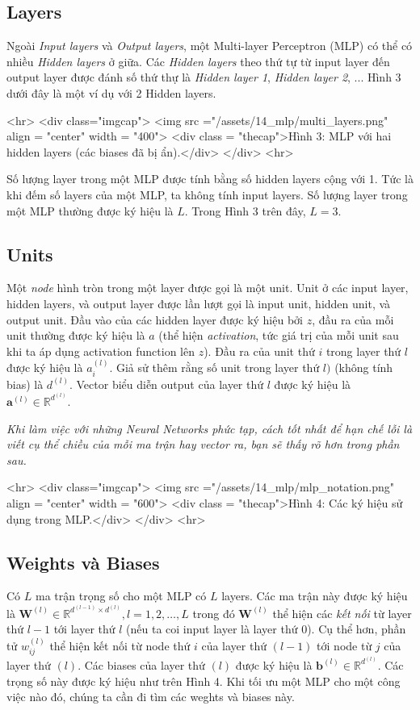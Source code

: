 { 
\subsection{Layers}
Ngoài \textit{Input layers} và \textit{Output layers}, một Multi-layer Perceptron (MLP) có thể có nhiều \textit{Hidden layers} ở giữa. Các \textit{Hidden layers} theo thứ tự từ input layer đến output layer được đánh số thứ thự là \textit{Hidden layer 1}, \textit{Hidden layer 2}, ... Hình 3 dưới đây là một ví dụ với 2 Hidden layers. 
 
<hr> 
<div class="imgcap"> 
 <img src ="/assets/14_mlp/multi_layers.png" align = "center" width = "400"> 
 <div class = "thecap">Hình 3: MLP với hai hidden layers (các biases đã bị ẩn).</div> 
</div> 
<hr> 
 
 
Số lượng layer trong một MLP được tính bằng số hidden layers cộng với 1. Tức là khi đếm số layers của một MLP, ta không tính input layers. Số lượng layer trong một MLP thường được ký hiệu là $L$. Trong Hình 3 trên đây, $L = 3$. 
 
 
\subsection{Units}
Một \textit{node} hình tròn trong một layer được gọi là một unit. Unit ở các input layer, hidden layers, và output layer được lần lượt gọi là input unit, hidden unit, và output unit. Đầu vào của các hidden layer được ký hiệu bởi $z$, đầu ra của mỗi unit thường được ký hiệu là $a$ (thể hiện \textit{activation}, tức giá trị của mỗi unit sau khi ta áp dụng activation function lên $z$). Đầu ra của unit thứ $i$ trong layer thứ $l$ được ký hiệu là $a_i^{(l)}$. Giả sử thêm rằng số unit trong layer thứ $l)$ (không tính bias) là $d^{(l)}$. Vector biểu diễn output của layer thứ $l$ được ký hiệu là $\mathbf{a}^{(l)} \in \mathbb{R}^{d^{(l)}}$. 
 
\textit{Khi làm việc với những Neural Networks phức tạp, cách tốt nhất để hạn chế lỗi là viết cụ thể chiều của mỗi ma trận hay vector ra, bạn sẽ thấy rõ hơn trong phần sau.} 
 
 
<hr> 
<div class="imgcap"> 
 <img src ="/assets/14_mlp/mlp_notation.png" align = "center" width = "600"> 
 <div class = "thecap">Hình 4: Các ký hiệu sử dụng trong MLP.</div> 
</div> 
<hr> 
 
 
\subsection{Weights và Biases}
Có $L$ ma trận trọng số cho một MLP có $L$ layers. Các ma trận này được ký hiệu là $\mathbf{W}^{(l)} \in \mathbb{R}^{d^{(l-1)}\times d^{(l)}}, l = 1, 2, \dots, L$ trong đó $\mathbf{W}^{(l)}$ thể hiện các \textit{kết nối} từ layer thứ $l-1$ tới layer thứ $l$ (nếu ta coi input layer là layer thứ $0$). Cụ thể hơn, phần tử $w^{(l)}_{ij}$ thể hiện kết nối từ node thứ $i$ của layer thứ $(l-1)$ tới node từ $j$ của layer thứ $(l)$. Các biases của layer thứ $(l)$ được ký hiệu là $\mathbf{b}^{(l)} \in \mathbb{R}^{d^{(l)}}$. Các trọng số này được ký hiệu như trên Hình 4. Khi tối ưu một MLP cho một công việc nào đó, chúng ta cần đi tìm các weghts và biases này. 
 
}
